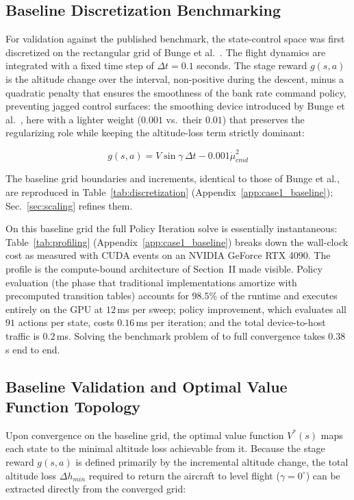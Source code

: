 \documentclass[journal ]{new-aiaa}
\begin{document}
\subsection{Baseline Discretization Benchmarking}
For validation against the published benchmark, the state-control space was first discretized on the rectangular grid of Bunge et al.\ \cite{Bunge2018}. The flight dynamics are integrated with a fixed time step of $\Delta t = 0.1$ seconds. The stage reward $g(s, a)$ is the altitude change over the interval, non-positive during the descent, minus a quadratic penalty that ensures the smoothness of the bank rate command policy, preventing jagged control surfaces: the smoothing device introduced by Bunge et al.\ \cite{Bunge2018}, here with a lighter weight ($0.001$ vs.\ their $0.01$) that preserves the regularizing role while keeping the altitude-loss term strictly dominant:

\begin{equation}
    g(s, a) = V \sin \gamma \, \Delta t - 0.001 \dot{\mu}_{cmd}^2
    \label{eq:reward-3dof}
\end{equation}

The baseline grid boundaries and increments, identical to those of
Bunge et al., are reproduced in Table~\ref{tab:discretization}
(Appendix~\ref{app:case1_baseline}); Sec.~\ref{sec:scaling} refines
them.

On this baseline grid the full Policy Iteration solve is essentially
instantaneous: Table~\ref{tab:profiling} (Appendix~\ref{app:case1_baseline})
breaks down the wall-clock cost as measured with CUDA events on an
NVIDIA GeForce RTX 4090. The
profile is the compute-bound architecture of Section~II made visible.
Policy evaluation (the phase that traditional implementations
amortize with precomputed transition tables) accounts for
$98.5\%$ of the runtime and executes entirely on the GPU at
$12$\,ms per sweep; policy improvement, which evaluates all $91$
actions per state, costs $0.16$\,ms per iteration; and the total
device-to-host traffic is $0.2$\,ms. Solving the benchmark problem of
\cite{Bunge2018} to full convergence takes $0.38$\,s end to end.

\subsection{Baseline Validation and Optimal Value Function Topology}
Upon convergence on the baseline grid, the optimal value function $V^*(s)$ maps each state to the minimal altitude loss achievable from it. Because the stage reward $g(s, a)$ is defined primarily by the incremental altitude change, the total altitude loss $\Delta h_{min}$ required to return the aircraft to level flight ($\gamma = 0^\circ$) can be extracted directly from the converged grid:
\end{document}
